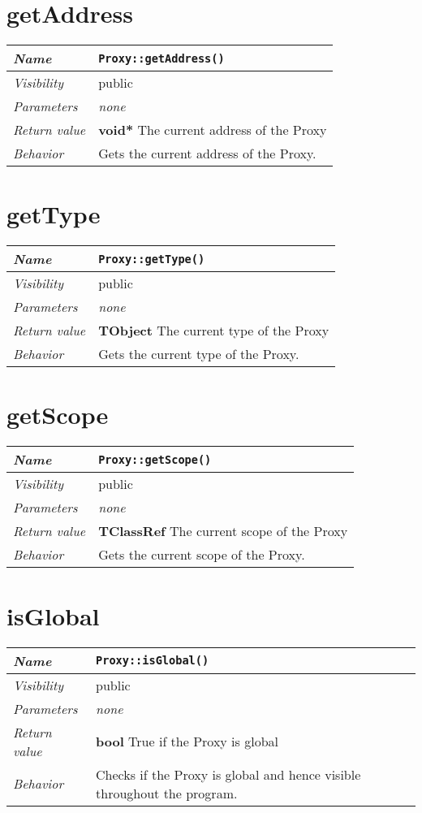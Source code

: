  \section{getAddress}
\begin{longtable}{p{3cm} @{\hskip 1cm} p{12cm}}
 \hline
\textit{Name} & \texttt{Proxy::getAddress()}\\
\hline
 \textit{Visibility} & public\\
\hline
\textit{Parameters} & \textit{none}\\
\hline
\textit{Return value} & \textbf{void*} The current address of the Proxy \\
  \hline
 \textit{Behavior} & Gets the current address of the Proxy. \\
\hline
\end{longtable} \pagebreak
 \section{getType}
\begin{longtable}{p{3cm} @{\hskip 1cm} p{12cm}}
 \hline
\textit{Name} & \texttt{Proxy::getType()}\\
\hline
 \textit{Visibility} & public\\
\hline
\textit{Parameters} & \textit{none}\\
\hline
\textit{Return value} & \textbf{TObject} The current type of the Proxy \\
  \hline
 \textit{Behavior} & Gets the current type of the Proxy. \\
\hline
\end{longtable} \pagebreak
 \section{getScope}
\begin{longtable}{p{3cm} @{\hskip 1cm} p{12cm}}
 \hline
\textit{Name} & \texttt{Proxy::getScope()}\\
\hline
 \textit{Visibility} & public\\
\hline
\textit{Parameters} & \textit{none}\\
\hline
\textit{Return value} & \textbf{TClassRef} The current scope of the Proxy \\
  \hline
 \textit{Behavior} & Gets the current scope of the Proxy. \\
\hline
\end{longtable} \pagebreak
 \section{isGlobal}
\begin{longtable}{p{3cm} @{\hskip 1cm} p{12cm}}
 \hline
\textit{Name} & \texttt{Proxy::isGlobal()}\\
\hline
 \textit{Visibility} & public\\
\hline
\textit{Parameters} & \textit{none}\\
\hline
\textit{Return value} & \textbf{bool} True if the Proxy is global \\
  \hline
 \textit{Behavior} & Checks if the Proxy is global and hence visible throughout the program. \\
\hline
\end{longtable} \pagebreak
